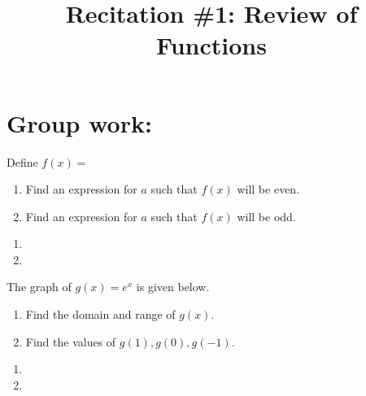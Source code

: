 \documentclass[handout]{ximera}
\title{Recitation \#1: Review of Functions}
\begin{document}
\begin{abstract}		\end{abstract}
\maketitle












\section{Group work:}



\begin{problem}
Define $f(x)=$
\begin{enumerate}	
	\item  Find an expression for $a$ such that $f(x)$ will be even.
	
	\item  Find an expression for $a$ such that $f(x)$ will be odd.
	
	\end{enumerate}
	
	\begin{freeResponse}
		\begin{enumerate}
		
		\item 
		
		\item  
		
		\end{enumerate}
	\end{freeResponse}
	
\end{problem}

\begin{instructorNotes}

\end{instructorNotes}



\begin{problem}
The graph of $g(x)=e^x$ is given below.
\begin{enumerate}	
	\item  Find the domain and range of $g(x)$.
	
	\item  Find the values of $g(1), g(0), g(-1)$.
	
	\end{enumerate}
	
	\begin{freeResponse}
		\begin{enumerate}
		
		\item 
		
		\item  
		
		\end{enumerate}
	\end{freeResponse}
	
\end{problem}

\begin{instructorNotes}

\end{instructorNotes}
\end{document}
